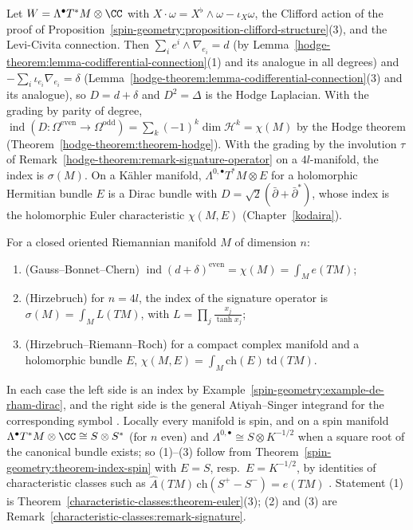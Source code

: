 \begin{example}\label{spin-geometry:example-de-rham-dirac}
Let $W = \Lambda^\bullet T^*M \otimes \CC$ with $X \cdot \omega = X^\flat \wedge \omega - \iota_X\omega$, the Clifford action of the proof of Proposition~\ref{spin-geometry:proposition-clifford-structure}(3), and the Levi-Civita connection. Then
$\sum_ie^i \wedge \nabla_{e_i} = d$ (by Lemma~\ref{hodge-theorem:lemma-codifferential-connection}(1) and its analogue in all degrees) and $-\sum_i\iota_{e_i}\nabla_{e_i} = \delta$ (Lemma~\ref{hodge-theorem:lemma-codifferential-connection}(3) and its
analogue), so $D = d + \delta$ and $D^2 = \Delta$ is the Hodge Laplacian. With the grading by parity of degree, $\operatorname{ind}(D \colon \Omega^{\mathrm{even}} \to \Omega^{\mathrm{odd}}) = \sum_k(-1)^k\dim\mathcal{H}^k = \chi(M)$ by the Hodge
theorem (Theorem~\ref{hodge-theorem:theorem-hodge}). With the grading by the involution $\tau$ of Remark~\ref{hodge-theorem:remark-signature-operator} on a $4l$-manifold, the index is $\sigma(M)$. On a K\"ahler manifold,
$\Lambda^{0,\bullet}T^*M \otimes E$ for a holomorphic Hermitian bundle $E$ is a Dirac bundle with $D = \sqrt2(\bar\partial + \bar\partial^*)$, whose index is the holomorphic Euler characteristic $\chi(M, E)$ (Chapter~\ref{kodaira}).
\end{example}

\begin{theorem}\label{spin-geometry:theorem-index-classical}
For a closed oriented Riemannian manifold $M$ of dimension $n$:
\begin{enumerate}
\item (Gauss--Bonnet--Chern) $\operatorname{ind}(d + \delta)^{\mathrm{even}} = \chi(M) = \int_Me(TM)$;
\item (Hirzebruch) for $n = 4l$, the index of the signature operator is $\sigma(M) = \int_ML(TM)$, with $L = \prod_j\frac{x_j}{\tanh x_j}$;
\item (Hirzebruch--Riemann--Roch) for a compact complex manifold and a holomorphic bundle $E$, $\chi(M, E) = \int_M\mathrm{ch}(E)\,\mathrm{td}(TM)$.
\end{enumerate}
\end{theorem}

In each case the left side is an index by Example~\ref{spin-geometry:example-de-rham-dirac}, and the right side is the general Atiyah--Singer integrand for the corresponding symbol \cite{atiyah-singer-1968-3}. Locally every
manifold is spin, and on a spin manifold $\Lambda^\bullet T^*M \otimes \CC \cong S \otimes S^*$ (for $n$ even) and $\Lambda^{0,\bullet} \cong S \otimes K^{-1/2}$ when a square root of the canonical bundle exists; so (1)--(3) follow from
Theorem~\ref{spin-geometry:theorem-index-spin} with $E = S$, resp.\ $E = K^{-1/2}$, by identities of characteristic classes such as $\hat{A}(TM)\,\mathrm{ch}(S^+ - S^-) = e(TM)$ \cite{lawson-michelsohn}. Statement (1) is
Theorem~\ref{characteristic-classes:theorem-euler}(3); (2) and (3) are Remark~\ref{characteristic-classes:remark-signature}.

